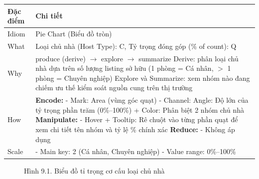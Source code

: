 \begin{longtable}{|p{2.8cm}|p{11.5cm}|}
\hline
\textbf{Đặc điểm} & \textbf{Chi tiết} \\
\hline
\endhead
\hline
\endfoot
Idiom & Pie Chart (Biểu đồ tròn) \\
\hline
What & Loại chủ nhà (Host Type): C, Tỷ trọng đóng góp (\% of count): Q \\
\hline
Why & produce (derive) $\rightarrow$ explore $\rightarrow$ summarize \newline
\newline
Derive: phân loại chủ nhà dựa trên số lượng listing sở hữu (1 phòng = Cá nhân, $>$ 1 phòng = Chuyên nghiệp) \newline
\newline
Explore và Summarize: xem nhóm nào đang chiếm ưu thế kiểm soát nguồn cung trên thị trường \\
\hline
How & \textbf{Encode:} \newline
\newline
- Mark: Area (vùng góc quạt) \newline
\newline
- Channel: Angle: Độ lớn của tỷ trọng phần trăm (0\%--100\%) \newline
\newline
\hspace{0.3cm} + Color: Phân biệt 2 nhóm chủ nhà \newline
\newline
\textbf{Manipulate:} \newline
\newline
- Hover + Tooltip: Rê chuột vào từng phần quạt để xem chi tiết tên nhóm và tỷ lệ \% chính xác \newline
\newline
\textbf{Reduce:} \newline
\newline
- Không áp dụng \\
\hline
Scale & - Main key: 2 (Cá nhân, Chuyên nghiệp) \newline
\newline
- Value range: 0\%--100\% \\
\hline
\end{longtable}

\begin{figure}[H]
    \centering
    \caption{Hình 9.1. Biểu đồ tỉ trọng cơ cấu loại chủ nhà}
    \label{fig:domain-task9-chart1}
\end{figure}

